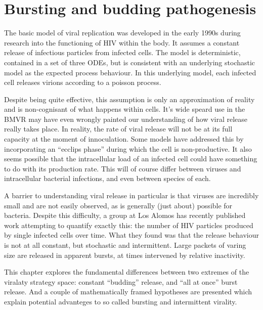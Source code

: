 


\chapter{Bursting and budding pathogenesis} 


















The basic model of viral replication was developed in the early 1990s during research into the functioning of HIV within the body. It assumes a constant release of infectious particles from infected cells. The model is deterministic, contained in a set of three ODEs, but is consistent with an underlying stochastic model as the expected process behaviour. In this underlying model, each infected cell releases virions according to a poisson process.\par 

Despite being quite effective, this assumption is only an approximation of reality and is non-cognisant of what happens within cells. It's wide speard use in the BMVR may have even wrongly painted our understanding of how viral release really takes place. In reality, the rate of viral release will not be at its full capacity at the moment of innoculation. Some models have addressed this by incorporating an ``ecclips phase'' during which the cell is non-productive. It also seems possible that the intracellular load of an infected cell could have something to do with its production rate. This will of course differ between viruses and intracellular bacterial infections, and even between species of each.  \par
A barrier to understanding viral release in particular is that viruses are incredibly small and are not easily observed, as is generally  (just about)  possible for bacteria. Despite this difficulty, a group at Los Alomos has recently published work attempting to quantify exactly this: the number of HIV particles produced by single infected cells over time. What they found was that the release behaviour is not at all constant, but stochastic and intermittent. Large packets of varing size are released in apparent bursts, at times intervened by relative inactivity.\par
This chapter explores the fundamental differences between two extremes of the viralaty strategy space: constant ``budding'' release, and ``all at once'' burst release. And a couple of mathematically framed hypotheses are presented which explain potential advanteges to so called bursting and intermittent virality.


